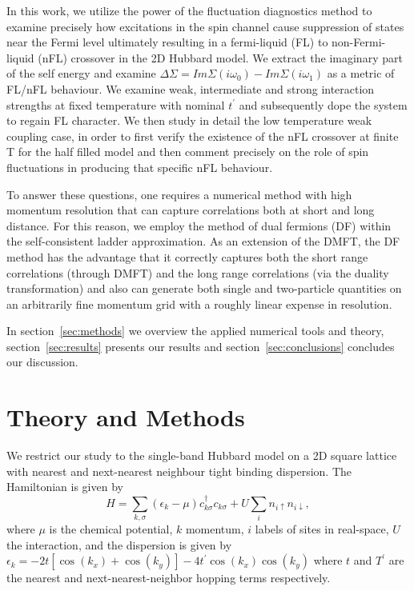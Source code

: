 \documentclass[twocolumn,notitlepage,prb,superscriptaddress,showpacs]{revtex4-1}
\begin{document}
In this work, we utilize the power of the fluctuation diagnostics method to examine precisely how excitations in the spin channel cause suppression of states near the Fermi level ultimately resulting in a fermi-liquid (FL) to non-Fermi-liquid (nFL) crossover in the 2D Hubbard model.  We extract the imaginary part of the self energy and examine $\Delta \Sigma = Im\Sigma (i\omega_0) - Im\Sigma (i\omega_1)$ as a metric of FL/nFL behaviour.\cite{park:2008, simkovic:2019}  We examine weak, intermediate and strong interaction strengths at fixed temperature with nominal $t^\prime$ and subsequently dope the system to regain FL character. \cite{wu:2017,schafer:2015}  We then study in detail the low temperature weak coupling case, in order to first verify the existence of the nFL crossover at finite T for the half filled model\cite{simkovic:2019} and then comment precisely on the role of spin fluctuations in producing that specific nFL behaviour.

To answer these questions, one requires a numerical method with high momentum resolution that can capture correlations both at short and long distance.  For this reason, we employ the method of dual fermions\cite{rubtsov:2008} (DF) within the self-consistent ladder approximation.\cite{opendf}   As an extension of the DMFT, the DF method has the advantage that it correctly captures both the short range correlations (through DMFT) and the long range correlations (via the duality transformation) and also can generate both single and two-particle quantities on an arbitrarily fine momentum grid with a roughly linear expense in resolution.  

In section~\ref{sec:methods} we overview the applied numerical tools and theory, section~\ref{sec:results} presents our results and section~\ref{sec:conclusions} concludes our discussion.





\section{Theory and Methods \label{sec:methods}}

We restrict our study to the single-band Hubbard model on a 2D square lattice with nearest and next-nearest neighbour tight binding dispersion.\cite{benchmarks}  The Hamiltonian is given by
\begin{equation}
H = \sum_{k,\sigma} \left(\epsilon_{k} -\mu\right)c_{k\sigma}^\dagger c_{k\sigma}+U\sum_i n_{i\uparrow}n_{i\downarrow},
\label{H}
\end{equation}
where $\mu$ is the chemical potential, $k$ momentum, $i$ labels of sites in real-space, $U$ the interaction, and the dispersion is given by
$\epsilon_k=-2t\left[\cos(k_x)+\cos(k_y)\right]-4t^\prime \cos(k_x)\cos(k_y)$ where $t$ and $T^\prime$ are the nearest and next-nearest-neighbor hopping terms respectively.
\end{document}
